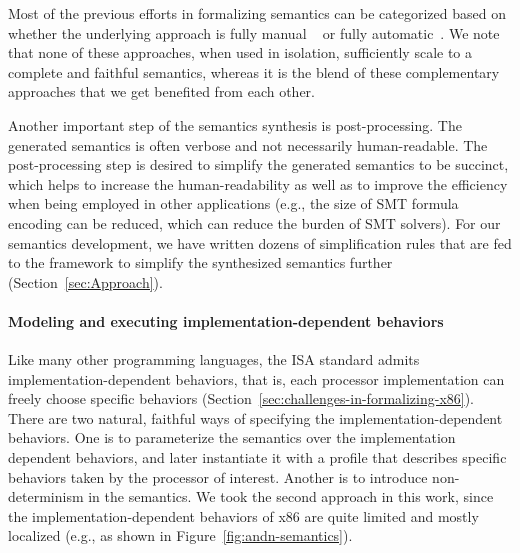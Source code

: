 {%
%
%

Most of the previous efforts in formalizing \ISA semantics can be categorized based on whether the underlying approach is fully manual ~\cite{Goel:FMCAD14, TSL:TOPLAS13, Leroy:2009, sail-x86} or fully automatic~\cite{Heule2016a, Roessle:CPP19, Hasabnis:ASPLOS16, Hasabnis:FSE16}. We note that none of these approaches, when used in isolation, sufficiently scale to a complete and faithful semantics, whereas it is the blend of these complementary approaches that we get benefited from each other.

Another important step of the semantics synthesis is post-processing. The generated semantics is often verbose and not necessarily human-readable. The post-processing step is desired to simplify the generated semantics to be succinct, which helps to increase the human-readability as well as to improve the efficiency when being employed in other applications (e.g., the size of SMT formula encoding can be reduced, which can reduce the burden of SMT solvers). For our semantics development, we have written dozens of simplification rules that are fed to the \K framework to simplify the synthesized semantics further (Section~\ref{sec:Approach}). 

\paragraph{Modeling and executing implementation-dependent behaviors}

Like many other programming languages, the \ISA ISA standard admits implementation-dependent behaviors, that is, each processor implementation can freely choose specific behaviors (Section~\ref{sec:challenges-in-formalizing-x86}).
There are two natural, faithful ways of specifying the implementation-dependent behaviors.
One is to parameterize the semantics over the implementation dependent behaviors, and later instantiate it with a profile that describes specific behaviors taken by the processor of interest.
Another is to introduce non-determinism in the semantics.
We took the second approach in this work, since the implementation-dependent behaviors of x86 are quite limited and mostly localized (e.g., as shown in Figure~\ref{fig:andn-semantics}).

}
